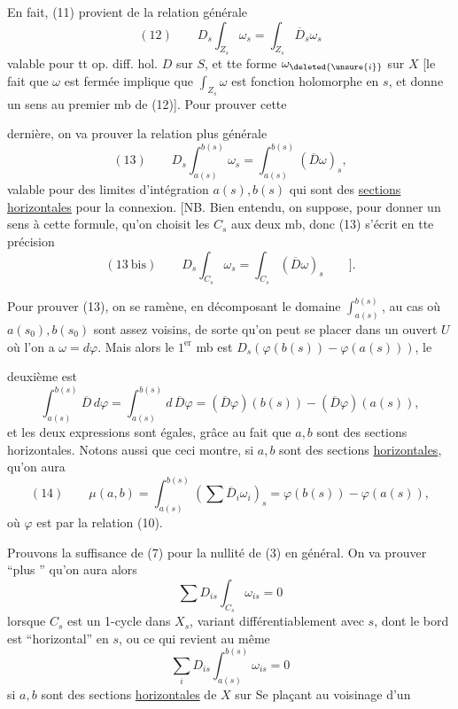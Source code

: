 En fait, (11) provient de la relation générale
\[
(12)\qquad D_s\int_{Z_s}\omega_s=\int_{Z_s}\overline D_s\omega_s
\]
valable pour tt op. diff. hol. $D$ sur $S$, et tte forme  $\omega_{\deleted{\unsure{i}}}$ sur $X$ [le fait que $\omega$ est fermée implique que $\int_{Z_s}\omega$ est fonction holomorphe en $s$, et donne un sens au premier mb de (12)]. Pour prouver cette

dernière, on  va prouver la relation plus générale
\[
(13)\qquad D_s\int_{a(s)}^{b(s)}\omega_s=\int_{a(s)}^{b(s)}(\overline D\omega)_s,
\]
valable pour des limites d'intégration $a(s),b(s)$ qui sont des \uline{sections horizontales} pour la connexion. [NB. Bien entendu, on suppose, pour donner un sens à cette formule, qu'on choisit les  $C_s$ aux deux mb, donc (13) s'écrit en tte précision
\[
(13\ \mathrm{bis})\qquad D_s\int_{C_s}\omega_s=\int_{C_s}(\overline D\omega)_s\qquad].
\]

Pour prouver (13), on se ramène, en  décomposant le domaine $\int_{a(s)}^{b(s)}$, au cas où $a(s_0),b(s_0)$ sont assez voisins, de sorte qu'on peut se placer dans un ouvert $U$ où l'on a $\omega=d\varphi$. Mais alors le $1^{\mathrm{er}}$ mb est $D_s(\varphi(b(s))-\varphi(a(s)))$, le

deuxième est
\[
\int_{a(s)}^{b(s)}\overline D\,d\varphi=\int_{a(s)}^{b(s)}d\,\overline D\varphi=(\overline D\varphi)(b(s))-(\overline D\varphi)(a(s)),
\]
 et les deux expressions sont égales, grâce au fait que $a,b$ sont des sections horizontales. Notons aussi que ceci montre, si $a,b$ sont des sections \uline{horizontales}, qu'on aura
\[
(14)\qquad \mu(a,b)=\int_{a(s)}^{b(s)}\left(\sum\overline D_i\omega_i\right)_s=\varphi(b(s))-\varphi(a(s)),
\]
où $\varphi$ est  par la relation (10).

Prouvons la suffisance de (7) pour la nullité de (3) en général. On va prouver ``plus '' qu'on aura alors
\[
\sum D_{is}\int_{C_s}\omega_{is}=0
\]
lorsque $C_s$ est un 1-cycle dans $X_s$, variant différentiablement avec $s$, dont le bord est ``horizontal'' en $s$, ou ce qui revient au même
\[
\sum_i D_{is}\int_{a(s)}^{b(s)}\omega_{is}=0
\]
si $a,b$ sont des sections \uline{horizontales} de $X$ sur    Se plaçant au voisinage d'un


